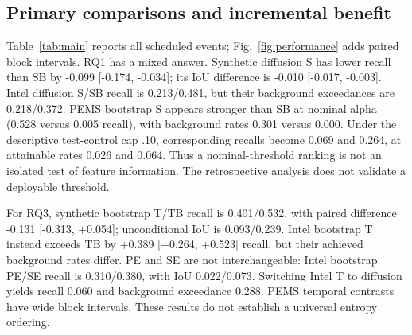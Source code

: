 \subsection{Primary comparisons and incremental benefit}
Table~\ref{tab:main} reports all scheduled events; Fig.~\ref{fig:performance}
adds paired block intervals. RQ1 has a mixed answer. Synthetic diffusion S
has lower recall than SB by -0.099 [-0.174, -0.034]; its
IoU difference is -0.010 [-0.017, -0.003].
Intel diffusion S/SB recall is 0.213/0.481, but their background
exceedances are 0.218/0.372.
PEMS bootstrap S appears stronger than SB at nominal alpha
(0.528 versus 0.005 recall), with background rates
0.301 versus 0.000.
Under the descriptive test-control cap .10, corresponding recalls become
0.069 and 0.264, at attainable rates
0.026 and 0.064.
Thus a nominal-threshold ranking is not an isolated test of feature information.
The retrospective analysis does not validate a deployable threshold.

For RQ3, synthetic bootstrap T/TB recall is 0.401/0.532,
with paired difference -0.131 [-0.313, +0.054]; unconditional IoU is
0.093/0.239.
Intel bootstrap T instead exceeds TB by +0.389 [+0.264, +0.523]
recall, but their achieved background rates differ. PE and SE are not interchangeable:
Intel bootstrap PE/SE recall is 0.310/0.380,
with IoU 0.022/0.073.
Switching Intel T to diffusion yields recall 0.060 and background
exceedance 0.288. PEMS temporal contrasts have wide
block intervals. These results do not establish a universal entropy ordering.

